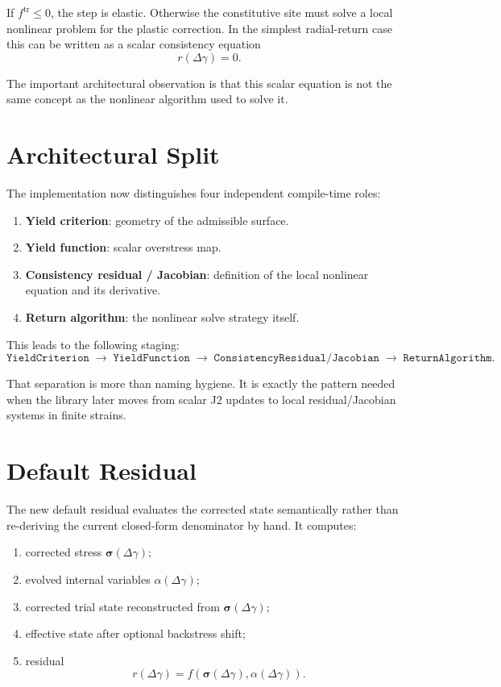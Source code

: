 If $f^{\mathrm{tr}} \le 0$, the step is elastic. Otherwise the constitutive
site must solve a local nonlinear problem for the plastic correction. In the
simplest radial-return case this can be written as a scalar consistency
equation
\[
  r(\Delta\gamma) = 0.
\]

The important architectural observation is that this scalar equation is not the
same concept as the nonlinear algorithm used to solve it.

\section{Architectural Split}

The implementation now distinguishes four independent compile-time roles:
\begin{enumerate}
  \item \textbf{Yield criterion}: geometry of the admissible surface.
  \item \textbf{Yield function}: scalar overstress map.
  \item \textbf{Consistency residual / Jacobian}: definition of the local
        nonlinear equation and its derivative.
  \item \textbf{Return algorithm}: the nonlinear solve strategy itself.
\end{enumerate}

This leads to the following staging:
\[
  \texttt{YieldCriterion}
  \;\to\;
  \texttt{YieldFunction}
  \;\to\;
  \texttt{ConsistencyResidual/Jacobian}
  \;\to\;
  \texttt{ReturnAlgorithm}.
\]

That separation is more than naming hygiene. It is exactly the pattern needed
when the library later moves from scalar J2 updates to local residual/Jacobian
systems in finite strains.

\section{Default Residual}

The new default residual evaluates the corrected state semantically rather than
re-deriving the current closed-form denominator by hand. It computes:
\begin{enumerate}
  \item corrected stress
    $\boldsymbol{\sigma}(\Delta\gamma)$;
  \item evolved internal variables
    $\alpha(\Delta\gamma)$;
  \item corrected trial state reconstructed from
    $\boldsymbol{\sigma}(\Delta\gamma)$;
  \item effective state after optional backstress shift;
  \item residual
    \[
      r(\Delta\gamma)
      = f\!\left(\boldsymbol{\sigma}(\Delta\gamma), \alpha(\Delta\gamma)\right).
    \]
\end{enumerate}

